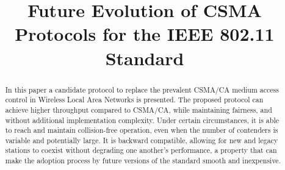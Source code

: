 \documentclass[conference]{IEEEtran}
\begin{document}
\title{Future Evolution of CSMA Protocols for the IEEE 802.11 Standard}


\author{
}





\maketitle


\begin{abstract}
In this paper a candidate protocol to replace the prevalent CSMA/CA medium access control in Wireless Local Area Networks is presented. The proposed protocol can achieve higher throughput compared to CSMA/CA, while maintaining fairness, and without additional implementation complexity. Under certain circumstances, it is able to reach and maintain collision-free operation, even when the number of contenders is variable and potentially large. It is backward compatible, allowing for new and legacy stations to coexist without degrading one another's performance, a property that can make the adoption process by future versions of the standard smooth and inexpensive.


\end{abstract}
\end{document}
